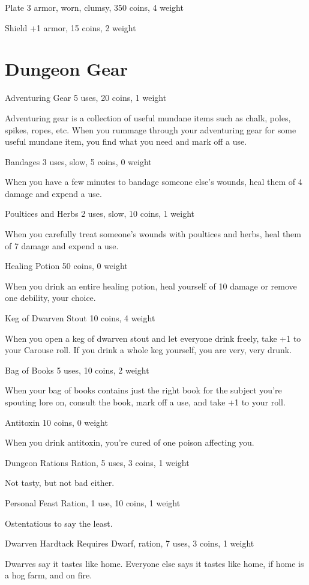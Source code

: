  Plate 3 armor, worn, clumsy, 350 coins, 4 weight


 Shield +1 armor, 15 coins, 2 weight
\section*{Dungeon Gear}


 Adventuring Gear 5 uses, 20 coins, 1 weight


 Adventuring gear is a collection of useful mundane items such as chalk, poles, spikes, ropes, etc. When you rummage through your adventuring gear for some useful mundane item, you find what you need and mark off a use.


 Bandages 3 uses, slow, 5 coins, 0 weight


 When you have a few minutes to bandage someone else's wounds, heal them of 4 damage and expend a use.


 Poultices and Herbs 2 uses, slow, 10 coins, 1 weight


 When you carefully treat someone's wounds with poultices and herbs, heal them of 7 damage and expend a use.


 Healing Potion 50 coins, 0 weight


 When you drink an entire healing potion, heal yourself of 10 damage or remove one debility, your choice.


 Keg of Dwarven Stout 10 coins, 4 weight


 When you open a keg of dwarven stout and let everyone drink freely, take +1 to your Carouse roll. If you drink a whole keg yourself, you are very, very drunk.


 Bag of Books 5 uses, 10 coins, 2 weight


 When your bag of books contains just the right book for the subject you're spouting lore on, consult the book, mark off a use, and take +1 to your roll.


 Antitoxin 10 coins, 0 weight


 When you drink antitoxin, you're cured of one poison affecting you.


 Dungeon Rations Ration, 5 uses, 3 coins, 1 weight


 Not tasty, but not bad either.


 Personal Feast Ration, 1 use, 10 coins, 1 weight


 Ostentatious to say the least.


 Dwarven Hardtack Requires Dwarf, ration, 7 uses, 3 coins, 1 weight


 Dwarves say it tastes like home. Everyone else says it tastes like home, if home is a hog farm, and on fire.



